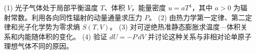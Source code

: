 (1) 光子气体处于局部平衡温度 \(T\)、体积 \(V\)，能量密度 \(u=aT^4\)，其中 \(a>0\) 为辐射常数。利用各向同性辐射的动量通量求压力 \(P\)。
(2) 由热力学第一定律、第二定律和光子化学势为零求熵 \(S(T,V)\)。
(3) 对可逆绝热准静态膨胀求温度—体积关系和内能随体积的变化。
(4) 验证 \(dU=-P\,dV\) 并讨论这种关系与非相对论单原子理想气体不同的原因。
